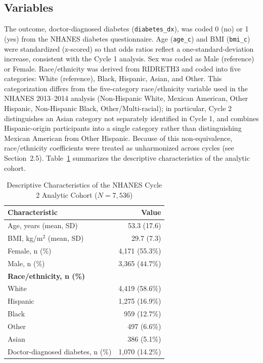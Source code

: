 \documentclass[11pt]{article}
\begin{document}
\subsection{Variables}
The outcome, doctor-diagnosed diabetes (\texttt{diabetes\_dx}), was coded
0 (no) or 1 (yes) from the NHANES diabetes questionnaire. Age
(\texttt{age\_c}) and BMI (\texttt{bmi\_c}) were standardized (z-scored) so
that odds ratios reflect a one-standard-deviation increase, consistent with
the Cycle 1 analysis. Sex was coded as Male (reference) or Female.
Race/ethnicity was derived from RIDRETH3 and coded into five categories:
White (reference), Black, Hispanic, Asian, and Other. This categorization
differs from the five-category race/ethnicity variable used in the
NHANES 2013--2014 analysis (Non-Hispanic White, Mexican American, Other
Hispanic, Non-Hispanic Black, Other/Multi-racial); in particular, Cycle 2
distinguishes an Asian category not separately identified in Cycle 1, and
combines Hispanic-origin participants into a single category rather than
distinguishing Mexican American from Other Hispanic. Because of this
non-equivalence, race/ethnicity coefficients were treated as unharmonized
across cycles (see Section~2.5). 
Table~\ref{tab:sample} summarizes the descriptive characteristics of the
analytic cohort.

\begin{table}[H]
\centering
\caption{Descriptive Characteristics of the NHANES Cycle 2 Analytic Cohort
($N=7{,}536$)}
\label{tab:sample}
\begin{tabular}{lr}
\toprule
\textbf{Characteristic} & \textbf{Value} \\
\midrule
Age, years (mean, SD) & 53.3 (17.6) \\
BMI, kg/m$^2$ (mean, SD) & 29.7 (7.3) \\
Female, n (\%) & 4,171 (55.3\%) \\
Male, n (\%) & 3,365 (44.7\%) \\
\midrule
\multicolumn{2}{l}{\textbf{Race/ethnicity, n (\%)}} \\
White & 4,419 (58.6\%) \\
Hispanic & 1,275 (16.9\%) \\
Black & 959 (12.7\%) \\
Other & 497 (6.6\%) \\
Asian & 386 (5.1\%) \\
\midrule
Doctor-diagnosed diabetes, n (\%) & 1,070 (14.2\%) \\
\bottomrule
\end{tabular}
\end{table}
\end{document}
